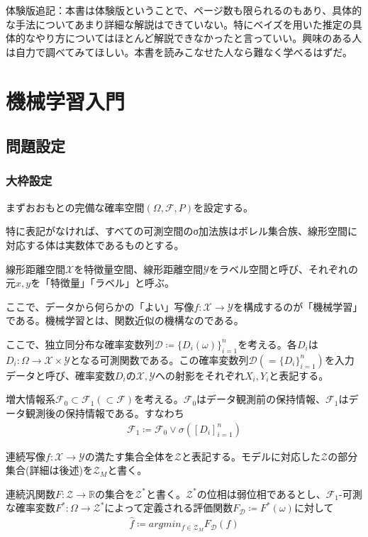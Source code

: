 \documentclass[dvipdfmx, a4paper]{jsarticle}
\begin{document}
体験版追記：本書は体験版ということで、ページ数も限られるのもあり、具体的な手法についてあまり詳細な解説はできていない。特にベイズを用いた推定の具体的なやり方についてはほとんど解説できなかったと言っていい。興味のある人は自力で調べてみてほしい。本書を読みこなせた人なら難なく学べるはずだ。

\newpage
\section{機械学習入門}

\subsection{問題設定}
\subsubsection{大枠設定}
まずおおもとの完備な確率空間$(\Omega,\mathcal{F},P)$を設定する。

特に表記がなければ、すべての可測空間のσ加法族はボレル集合族、線形空間に対応する体は実数体であるものとする。

線形距離空間$\mathcal{X}$を特徴量空間、線形距離空間$\mathcal{Y}$をラベル空間と呼び、それぞれの元$x,y$を「特徴量」「ラベル」と呼ぶ。

ここで、データから何らかの「よい」写像$f:\mathcal{X}\to\mathcal{Y}$を構成するのが「機械学習」である。機械学習とは、関数近似の機構なのである。

ここで、独立同分布な確率変数列$\mathcal{D}\coloneqq\{D_i(\omega)\}_{i=1}^n$を考える。各$D_i$は$D_i\colon\Omega\to\mathcal{X}\times\mathcal{Y}$となる可測関数である。この確率変数列$\mathcal{D}(=\{D_i\}_{i=1}^n)$を入力データと呼び、確率変数$D_i$の$\mathcal{X},\mathcal{Y}$への射影をそれぞれ$X_i,Y_i$と表記する。

増大情報系$\mathcal{F}_0\subset\mathcal{F}_1(\subset\mathcal{F})$を考える。$\mathcal{F}_0$はデータ観測前の保持情報、$\mathcal{F}_1$はデータ観測後の保持情報である。すなわち
\begin{align}
\mathcal{F}_1\coloneqq\mathcal{F}_0\vee\sigma([D_i]^n_{i=1})
\end{align}


連続写像$f\colon\mathcal{X}\to\mathcal{Y}$の満たす集合全体を$\mathcal{Z}$と表記する。モデルに対応した$\mathcal{Z}$の部分集合(詳細は後述)を$\mathcal{Z}_M$と書く。

連続汎関数$F\colon\mathcal{Z}\rightarrow\mathbb{R}$の集合を$\mathcal{Z}^*$と書く。$\mathcal{Z}^*$の位相は弱位相であるとし、$\mathcal{F}_1$-可測な確率変数$F^*\colon\Omega\rightarrow \mathcal{Z}^*$によって定義される評価関数$F_\mathcal{D}\coloneqq F^*(\omega)$に対して
\begin{align}
\hat{f}\coloneqq argmin_{f\in \mathcal{Z}_M}F_\mathcal{D}(f)
\end{align}
\end{document}
